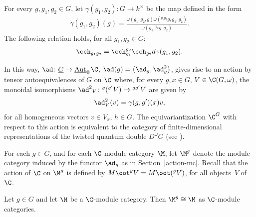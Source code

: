 For every $g, g_1, g_2 \in G$, let $\gamma(g_1, g_2)\colon G \to k^\times$ be the map def\/ined in the form
\begin{gather*}
\gamma(g_1, g_2)(g) = \frac{\omega(g_1, g_2, g) \omega({}^{g_1g_2}g, g_1, g_2)}{\omega(g_1,{}^{g_2}g, g_2)}.
\end{gather*}
The following relation holds, for all $g_1, g_2 \in G$:
\begin{gather}\label{rel-omega}
\cch_{g_1g_2} = \cch_{g_1}^{g_2} \cch_{g_2} d \gamma(g_1, g_2) .
\end{gather}

In this way, $\ad\colon \underline G \to \underline{\text{Aut}}_\otimes\C$, $\ad(g) = \big(\ad_g, \ad_g^2\big)$, gives rise to an action by tensor autoequivalences of $G$ on $\C$ where, for every $g, x \in G$, $V \in \C(G, \omega)$, the monoidal isomorphisms ${\ad^2}_V\colon {}^g({}^{g'}V) \to {}^{gg'}V$ are given by
\begin{gather*}\ad^2_V(v) = \gamma(g, g') (x) v,\end{gather*} for all homogeneous vectors $v \in V_x$, $h \in G$. The equivariantization $\C^G$ with respect to this action is equivalent to the category of f\/inite-dimensional representations of the twisted quantum double $D^\omega G$ (see \cite[Lemma~6.3]{naidu}).

For each $g \in G$, and for each $\C$-module category $\M$, let $\M^g$ denote the module category induced by the functor $\ad_g$ as in Section~\ref{action-mc}. Recall that the action of $\C$ on $\M^g$ is def\/ined by $M\oot^g V = M\oot ({}^gV)$, for all objects~$V$ of~$\C$.

\begin{Lemma}\label{adj-triv} Let $g \in G$ and let $\M$ be a $\C$-module category. Then $\M^g \cong \M$ as $\C$-module categories.
\end{Lemma}

